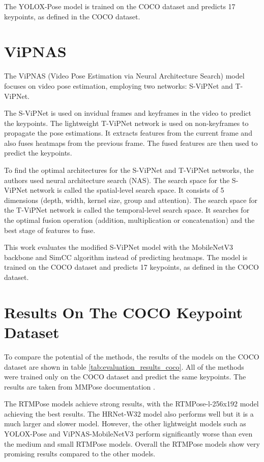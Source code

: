 The YOLOX-Pose model is trained on the COCO dataset and predicts 17 keypoints, as defined in the COCO dataset.

\section{ViPNAS}
\label{vipnas}

The ViPNAS (Video Pose Estimation via Neural Architecture Search) \cite{vipnas} model focuses on video pose estimation, employing two networks: S-ViPNet and T-ViPNet.

The S-ViPNet is used on invidual frames and keyframes in the video to predict the keypoints. The lightweight T-ViPNet network is used on non-keyframes to propagate the pose estimations. It extracts features from the current frame and also fuses heatmaps from the previous frame. The fused features are then used to predict the keypoints.

To find the optimal architectures for the S-ViPNet and T-ViPNet networks, the authors used neural architecture search (NAS). The search space for the S-ViPNet network is called the spatial-level search space. It consists of 5 dimensions (depth, width, kernel size, group and attention). The search space for the T-ViPNet network is called the temporal-level search space. It searches for the optimal fusion operation (addition, multiplication or concatenation) and the best stage of features to fuse.

This work evaluates the modified S-ViPNet model with the MobileNetV3 \cite{mobilenetv3} backbone and SimCC \cite{simcc} algorithm instead of predicting heatmaps. The model is trained on the COCO dataset and predicts 17 keypoints, as defined in the COCO dataset.

\section{Results On The COCO Keypoint Dataset}
To compare the potential of the methods, the results of the models on the COCO dataset are shown in table \ref{tab:evaluation_results_coco}. All of the methods were trained only on the COCO dataset and predict the same keypoints. The results are taken from MMPose documentation \cite{mmpose2020}.

The RTMPose models achieve strong results, with the RTMPose-l-256x192 model achieving the best results. The HRNet-W32 model also performs well but it is a much larger and slower model. However, the other lightweight models such as YOLOX-Pose and ViPNAS-MobileNetV3 perform significantly worse than even the medium and small RTMPose models. Overall the RTMPose models show very promising results compared to the other models.

